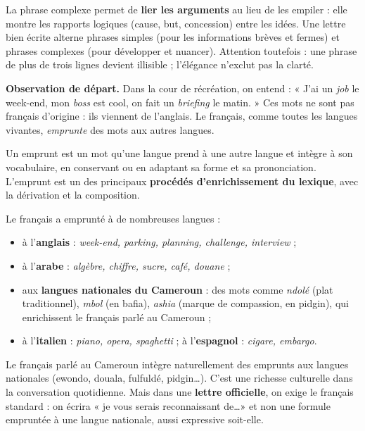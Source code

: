 \documentclass[11pt]{article}
\newcommand{\cle}[1]{{\popxbold\color{popdark}#1}}
\newcounter{popsec}
\newcounter{popsub}
\newcommand{\courssub}[1]{%
  \stepcounter{popsub}%
  \par\vspace{9pt}\noindent{\popxbold\fontsize{11.5}{13}\selectfont\color{popink}{\color{poporange}\thepopsec.\thepopsub}\hspace{6pt}#1}\par\nopagebreak\vspace{4pt}
}
\begin{document}
\begin{aretenir}
La phrase complexe permet de \textbf{lier les arguments} au lieu de les empiler : elle montre les rapports logiques (cause, but, concession) entre les idées. Une lettre bien écrite alterne phrases simples (pour les informations brèves et fermes) et phrases complexes (pour développer et nuancer). Attention toutefois : une phrase de plus de trois lignes devient illisible ; l'élégance n'exclut pas la clarté.
\end{aretenir}

\courssub{L'emprunt : définition et origines}

\textbf{Observation de départ.} Dans la cour de récréation, on entend : « J'ai un \emph{job} le week-end, mon \emph{boss} est cool, on fait un \emph{briefing} le matin. » Ces mots ne sont pas français d'origine : ils viennent de l'anglais. Le français, comme toutes les langues vivantes, \emph{emprunte} des mots aux autres langues.

\begin{definition}
Un \cle{emprunt} est un mot qu'une langue prend à une autre langue et intègre à son vocabulaire, en conservant ou en adaptant sa forme et sa prononciation. L'emprunt est un des principaux \textbf{procédés d'enrichissement du lexique}, avec la dérivation et la composition.
\end{definition}

Le français a emprunté à de nombreuses langues :
\begin{itemize}
\item à l'\textbf{anglais} : \emph{week-end, parking, planning, challenge, interview} ;
\item à l'\textbf{arabe} : \emph{algèbre, chiffre, sucre, café, douane} ;
\item aux \textbf{langues nationales du Cameroun} : des mots comme \emph{ndolé} (plat traditionnel), \emph{mbol} (en bafia), \emph{ashia} (marque de compassion, en pidgin), qui enrichissent le français parlé au Cameroun ;
\item à l'\textbf{italien} : \emph{piano, opera, spaghetti} ; à l'\textbf{espagnol} : \emph{cigare, embargo}.
\end{itemize}

\begin{savaistu}
Le français parlé au Cameroun intègre naturellement des emprunts aux langues nationales (ewondo, douala, fulfuldé, pidgin\ldots). C'est une richesse culturelle dans la conversation quotidienne. Mais dans une \textbf{lettre officielle}, on exige le français standard : on écrira « je vous serais reconnaissant de\ldots » et non une formule empruntée à une langue nationale, aussi expressive soit-elle.
\end{savaistu}
\end{document}
